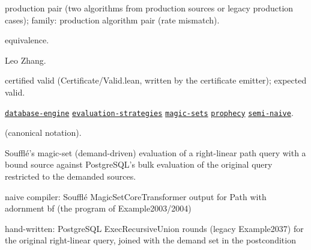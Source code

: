 \documentclass[10pt]{article}
\begin{document}
\begin{description}[leftmargin=2.6cm,style=nextline,itemsep=1pt]

\item[Category] production pair (two algorithms from production sources or legacy production cases); family: production algorithm pair (rate mismatch).

\item[Kind] equivalence.

\item[Contributors] Leo Zhang.

\item[Status] certified valid (Certificate/Valid.lean, written by the certificate emitter); expected valid.

\item[Tags] \hyperref[tag:database-engine]{\texttt{database-engine}} \hyperref[tag:evaluation-strategies]{\texttt{evaluation-strategies}} \hyperref[tag:magic-sets]{\texttt{magic-sets}} \hyperref[tag:prophecy]{\texttt{prophecy}} \hyperref[tag:semi-naive]{\texttt{semi-naive}}.

\item[Input]  (canonical notation).

\item[Summary] Soufflé's magic-set (demand-driven) evaluation of a right-linear path query with a bound source against PostgreSQL's bulk evaluation of the original query restricted to the demanded sources.

\item[Sides] naive compiler: Soufflé MagicSetCoreTransformer output for Path with adornment bf (the program of Example2003/2004) \par hand-written: PostgreSQL ExecRecursiveUnion rounds (legacy Example2037) for the original right-linear query, joined with the demand set in the postcondition


\end{description}
\end{document}
